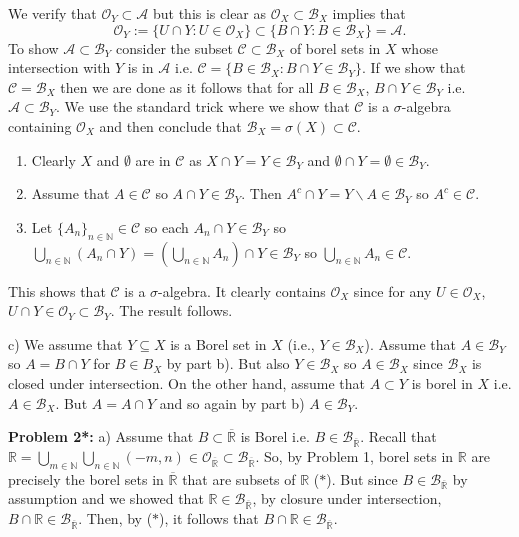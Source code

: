 \documentclass[12pt]{amsart} %
\def\N{\mathbb{N}}
\def\R{\mathbb{R}}
\def\C{\mathcal{C}}
\def\sub{\subseteq}
\def\O{\mathcal{O}}
\def\B{\mathcal{B}}
\def\A{\mathcal{A}}
\begin{document}
We verify that $\O_Y \subset \A$ but this is clear as $\O_X \subset \B_X$ implies that $$\O_Y := \{U \cap Y: U \in \O_X\} \subset \{B \cap Y : B \in \B_X\} = \A.$$ 
To show $\A \subset \B_Y$ consider the subset $\C \subset \B_X$ of borel sets in $X$ whose intersection with $Y$ is in  $\A$ i.e.  $\C = \{B \in \B_X : B \cap Y \in \B_Y\}$. If we show that $\C = \B_X$ then we are done as it follows that for all  $B \in \B_X$, $B \cap Y \in \B_Y$ i.e. $\A \subset \B_Y$. We use the standard trick where we show that $\C$ is a $\sigma$-algebra containing $\O_X$ and then conclude that $\B_X = \sigma(X) \subset \C$. 
\begin{enumerate}
	\item Clearly $X$ and  $\emptyset$ are in $\C$ as  $X \cap Y = Y \in \B_Y$ and 
		$\emptyset \cap Y = \emptyset \in \B_Y$. 
	\item Assume that $A \in \C$ so $A \cap Y \in \B_Y$. Then $A^c \cap Y = Y \backslash A \in \B_Y$ so $A^c \in \C$. 
	\item Let $\{A_n\}_{n \in \N} \in \C$ so each $A_n \cap Y \in \B_Y$ so $\bigcup_{n \in \N} \left( A_n \cap Y \right)  = \left( \bigcup_{n \in \N} A_n  \right) \cap Y \in \B_Y$ so $\bigcup_{n \in \N} A_n \in \C$. 
\end{enumerate}
This shows that $\C$ is a  $\sigma$-algebra. It clearly contains $\O_X$ since for any  $U \in \O_X$, $U \cap Y \in \O_Y \subset \B_Y$. The result follows. 

\smallskip 
c) We assume that $Y\sub X$ is a Borel set in $X$ (i.e., $Y\in   \mathcal{B}_X$). Assume that $A \in \B_Y$ so $A = B \cap Y$ for  $B \in B_X$ by part b). But also $Y \in \B_X$ so $A \in 
\B_X$ since $\B_X$ is closed under intersection. On the other hand, assume that $A \subset Y$ is borel in $X$ i.e.  $A \in \B_X$. But $A = A \cap Y$ and so again by part b)  $A \in \B_Y$. 


 \bigskip
\noindent
\textbf{Problem 2*:}  a) Assume that $B \subset \overline{\R}$ is Borel i.e. $B \in \B_{\overline{\R}}$. Recall that $\R = \bigcup_{m \in \N} \bigcup_{n \in \N}\left( -m,n \right) \in \O_{\overline{\R}} \subset \B_{\overline{\R}}$. So, by Problem 1, borel sets in $\R$ are precisely the borel sets in  $\overline{\R}$ that are subsets of $\R$ ($*$). But since $B \in \B_{\overline{\R}}$ by assumption and we showed that $\R \in \B_{\overline{\R}}$, by closure under intersection, $B \cap \R \in \B_{\overline{\R}}$. Then, by ($*$), it follows that $B \cap \R \in \B_{\overline{\R}}$.
\end{document}

